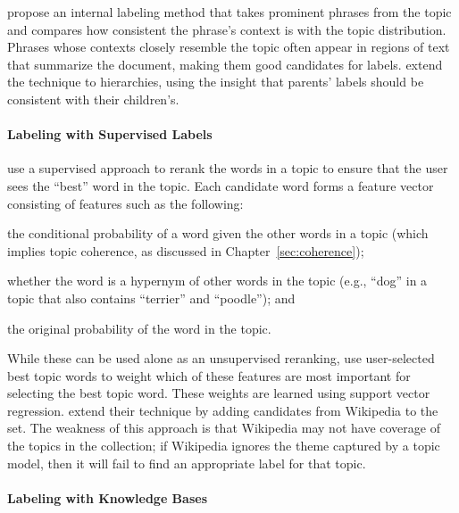 \citet{mei-07} propose an internal labeling method that takes
prominent phrases from the topic and compares how consistent the
phrase's context is with the topic distribution.  Phrases whose
contexts closely resemble the topic often appear in regions of text
that summarize the document, making them good candidates for labels.
\citet{mao-12} extend the technique to hierarchies, using the insight
that parents' labels should be consistent with their children's.



\paragraph{Labeling with Supervised Labels}


\citet{lau-10} use a supervised approach to rerank the words in a
topic to ensure that the user sees the ``best'' word in the
topic. Each candidate word forms a feature vector consisting of
features such as the following:
\begin{itemize*}
\item the conditional probability of a word given the other words in a
  topic (which implies topic coherence, as discussed in
Chapter~\ref{sec:coherence});
\item whether the word is a hypernym of other words in the topic
  (e.g., ``dog'' in a topic that also contains ``terrier'' and
  ``poodle''); and
\item the original probability of the word in the topic.
\end{itemize*}

While these can be used alone as an unsupervised reranking,
\citet{lau-10} use user-selected best topic words to weight which of
these features are most important for selecting the best topic word.
These weights are learned using support vector regression.
\citet{lau-11} extend their technique by adding candidates from
Wikipedia to the set.
The weakness of this approach is that Wikipedia may not have coverage
of the topics in the collection; if Wikipedia ignores the theme
captured by a topic model, then it will fail to find an appropriate
label for that topic.

\paragraph{Labeling with Knowledge Bases}

